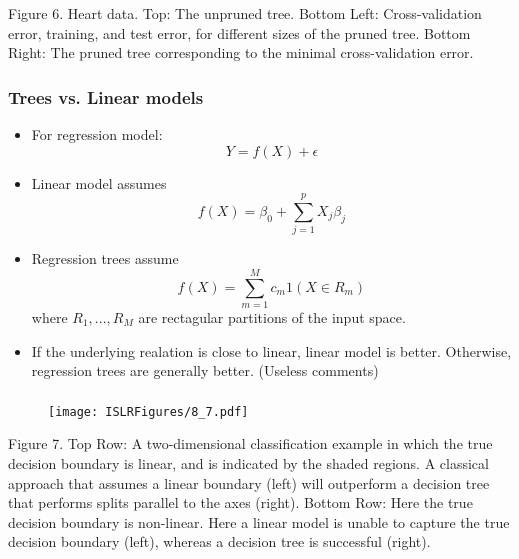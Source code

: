 \documentclass{beamer}
\begin{document}
                \begin{frame}
               
               
               Figure 6. Heart data. Top: The unpruned tree. Bottom Left: 
               Cross-validation error, training, and test error, for different sizes of the pruned tree.
               Bottom Right: The pruned tree corresponding to the minimal cross-validation
               error.
                 \end{frame} 
                
               \begin{frame}
               	\frametitle{Trees vs. Linear models}
               	\begin{itemize}
               		\item For regression model:
               		$$ Y = f(X) + \epsilon$$
               		\item  Linear model assumes
               		$$f(X) = \beta_0 + \sum_{j=1}^p X_j \beta_j$$
               		\item  Regression trees assume
               		$$ f(X)= \sum_{m=1}^M c_m 1(X \in R_m)$$
               		where $R_1, ..., R_M$ are rectagular partitions of the input space.
               		\item  If the underlying realation is close to linear, linear model is
               		better. Otherwise, regression trees are generally better.
               		(Useless comments)
               		
             
               	\end{itemize}
               \end{frame} 
               
               
           
           \begin{frame}
           	\frametitle{ }
           	\begin{figure}
           		\centering
           		
           		\centering
           		\texttt{[image: ISLRFigures/8\_7.pdf]}
           		
           	\end{figure}
           \end{frame}
           
           \begin{frame}
           	
           	
           	
           	
           	Figure 7. Top Row: A two-dimensional classification example in which
           	the true decision boundary is linear, and is indicated by the shaded regions.
           	A classical approach that assumes a linear boundary (left) will outperform a decision
           	tree that performs splits parallel to the axes (right). Bottom Row: Here the
           	true decision boundary is non-linear. Here a linear model is unable to capture
           	the true decision boundary (left), whereas a decision tree is successful (right).
           	
           \end{frame}     
               
\end{document}
